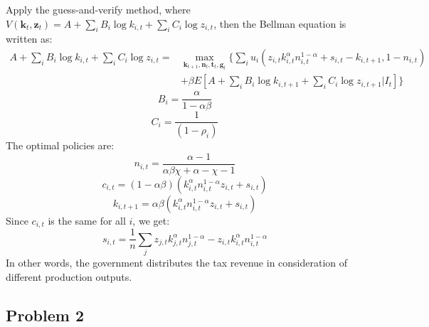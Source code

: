 \documentclass{article}
\begin{document}
Apply the guess-and-verify method, where \(V(\mathbf{k}_t, \mathbf{z}_t) = A + \sum_{i} B_i \log k_{i, t} + \sum_{i} C_i \log z_{i, t}\), then the Bellman equation is written as:
\begin{align*}
    A +  \sum_{i} B_i \log k_{i, t} + \sum_{i} C_i \log z_{i, t} = & \max_{\mathbf{k}_{t+1}, \mathbf{n}_{t}, \mathbf{t}_{t}, \mathbf{g}_{t}} \{ \sum_{i} u_{i}\left(z_{i,t} k_{i,t}^\alpha n_{i,t}^{1-\alpha} + s_{i, t} - k_{i, t+1}, 1 - n_{i,t}\right) \\
    & + \beta E[A + \sum_{i} B_i \log k_{i, t+1} + \sum_{i} C_i \log z_{i, t+1} | I_t] \}
\end{align*}
\begin{equation}
    B_i = \frac{\alpha}{1-\alpha\beta}
\end{equation}
\begin{equation}
    C_i = \frac{1}{(1-\rho_i)}
\end{equation}
The optimal policies are:
\begin{equation}
    n_{i,t} = \frac{{\alpha - 1}}{{\alpha \beta \chi + \alpha - \chi - 1}}
\end{equation}
\begin{equation}
    c_{i,t} = (1 -\alpha \beta) (k_{i,t}^\alpha n_{i,t}^{1 - \alpha} z_{i,t} + s_{i,t})
\end{equation}
\begin{equation}
    k_{i,t+1} = \alpha \beta (k_{i,t}^{\alpha} n_{i,t}^{1 - \alpha} z_{i,t} + s_{i,t})
\end{equation}
Since \(c_{i,t}\) is the same for all \(i\), we get:
\begin{equation}
    s_{i, t} = \frac{1}{n} \sum_{j} z_{j, t} k_{j,t}^\alpha n_{j,t}^{1-\alpha} - z_{i,t} k_{i,t}^\alpha n_{i,t}^{1 - \alpha} 
\end{equation}
In other words, the government distributes the tax revenue in consideration of different production outputs.

\subsection{Problem 2}
\end{document}
